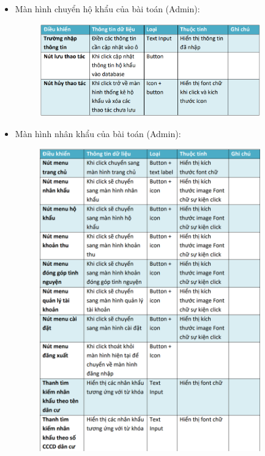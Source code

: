 \documentclass{article}
\begin{document}
\begin{itemize}
\begin{figure}[H]
    \end{figure}
    \item Màn hình chuyển hộ khẩu của bài toán (Admin):
    \begin{figure}[H]
        \centering
        \includegraphics[width=0.9\textwidth]{Ảnh chương 4/Chuyẻn hộ khẩu 1.png}
    \end{figure}
    \vspace{3cm}
    \item Màn hình nhân khẩu của bài toán (Admin):
    \begin{figure}[H]
        \centering
        \includegraphics[width=0.9\textwidth]{Ảnh chương 4/Dân cư Admin 1.png}

\end{figure}
\end{itemize}
\end{document}

